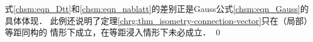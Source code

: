 式\eqref{chsm:eqn_Dtt}和\eqref{chsm:eqn_nablatt}的差别正是Gauss公式\eqref{chsm:eqn_Gauss}的具体体现．
此例还说明了定理\ref{chrg:thm_isometry-connection-vector}只在{\kaishu （局部）等距同构}的
情形下成立，在等距浸入情形下未必成立．
\qed


